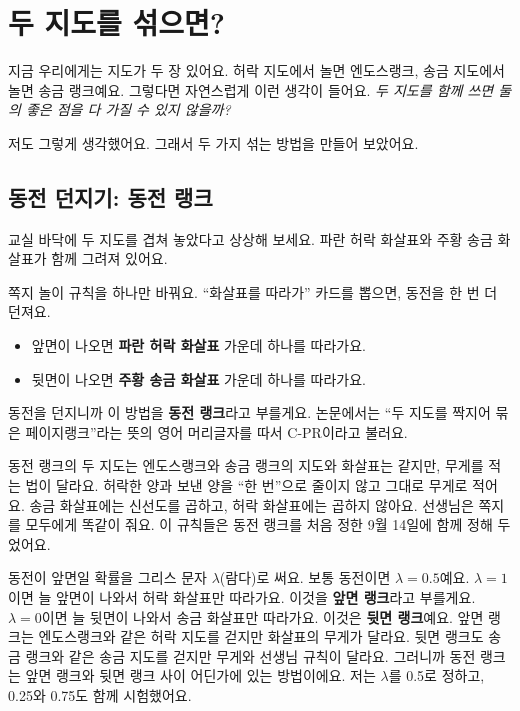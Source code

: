 \chapter{두 지도를 섞으면?}

지금 우리에게는 지도가 두 장 있어요.
허락 지도에서 놀면 엔도스랭크, 송금 지도에서 놀면 송금 랭크예요.
그렇다면 자연스럽게 이런 생각이 들어요.
\emph{두 지도를 함께 쓰면 둘의 좋은 점을 다 가질 수 있지 않을까?}

저도 그렇게 생각했어요.
그래서 두 가지 섞는 방법을 만들어 보았어요.

\section{동전 던지기: 동전 랭크}

교실 바닥에 두 지도를 겹쳐 놓았다고 상상해 보세요.
파란 허락 화살표와 주황 송금 화살표가 함께 그려져 있어요.

쪽지 놀이 규칙을 하나만 바꿔요.
“화살표를 따라가” 카드를 뽑으면, 동전을 한 번 더 던져요.

\begin{itemize}
\item 앞면이 나오면 \textcolor{allowcol}{\textbf{파란 허락 화살표}} 가운데 하나를 따라가요.
\item 뒷면이 나오면 \textcolor{sendcol}{\textbf{주황 송금 화살표}} 가운데 하나를 따라가요.
\end{itemize}

동전을 던지니까 이 방법을 \textbf{동전 랭크}라고 부를게요.
논문에서는 “두 지도를 짝지어 묶은 페이지랭크”라는 뜻의 영어 머리글자를 따서 C-PR이라고 불러요.

동전 랭크의 두 지도는 엔도스랭크와 송금 랭크의 지도와 화살표는 같지만, 무게를 적는 법이 달라요.
허락한 양과 보낸 양을 “한 번”으로 줄이지 않고 그대로 무게로 적어요.
송금 화살표에는 신선도를 곱하고, 허락 화살표에는 곱하지 않아요.
선생님은 쪽지를 모두에게 똑같이 줘요.
이 규칙들은 동전 랭크를 처음 정한 9월 14일에 함께 정해 두었어요.

동전이 앞면일 확률을 그리스 문자 $\lambda$(람다)로 써요.
보통 동전이면 $\lambda = 0.5$예요.
$\lambda = 1$이면 늘 앞면이 나와서 허락 화살표만 따라가요. 이것을 \textbf{앞면 랭크}라고 부를게요.
$\lambda = 0$이면 늘 뒷면이 나와서 송금 화살표만 따라가요. 이것은 \textbf{뒷면 랭크}예요.
앞면 랭크는 엔도스랭크와 같은 허락 지도를 걷지만 화살표의 무게가 달라요.
뒷면 랭크도 송금 랭크와 같은 송금 지도를 걷지만 무게와 선생님 규칙이 달라요.
그러니까 동전 랭크는 앞면 랭크와 뒷면 랭크 사이 어딘가에 있는 방법이에요.
저는 $\lambda$를 0.5로 정하고, 0.25와 0.75도 함께 시험했어요.


